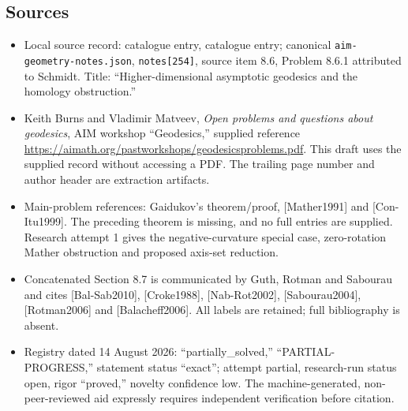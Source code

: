 \documentclass[11pt]{article}
\begin{document}
\subsection{Sources}
\begin{itemize}
\item Local source record: catalogue entry, catalogue entry; canonical \texttt{aim-geometry-notes.json}, \texttt{notes[254]}, source item 8.6, Problem 8.6.1 attributed to Schmidt. Title: ``Higher-dimensional asymptotic geodesics and the homology obstruction.''
\item Keith Burns and Vladimir Matveev, \emph{Open problems and questions about geodesics}, AIM workshop ``Geodesics,'' supplied reference \url{https://aimath.org/pastworkshops/geodesicsproblems.pdf}. This draft uses the supplied record without accessing a PDF. The trailing page number and author header are extraction artifacts.
\item Main-problem references: Gaidukov's theorem/proof, [Mather1991] and [Con-Itu1999]. The preceding theorem is missing, and no full entries are supplied. Research attempt 1 gives the negative-curvature special case, zero-rotation Mather obstruction and proposed axis-set reduction.
\item Concatenated Section 8.7 is communicated by Guth, Rotman and Sabourau and cites [Bal-Sab2010], [Croke1988], [Nab-Rot2002], [Sabourau2004], [Rotman2006] and [Balacheff2006]. All labels are retained; full bibliography is absent.
\item Registry dated 14 August 2026: ``partially\_solved,'' ``PARTIAL-PROGRESS,'' statement status ``exact''; attempt partial, research-run status open, rigor ``proved,'' novelty confidence low. The machine-generated, non-peer-reviewed aid expressly requires independent verification before citation.
\end{itemize}
\end{document}
